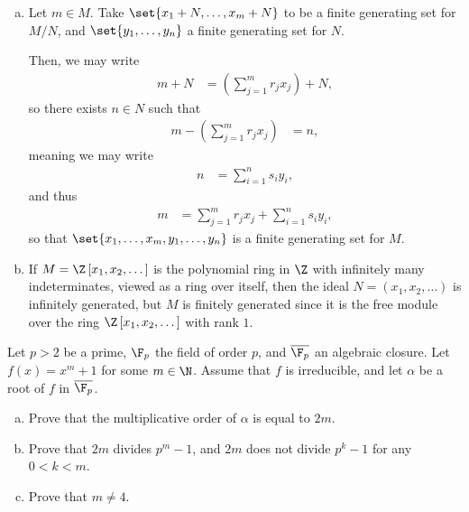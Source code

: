 \documentclass[10pt]{mypackage}
\begin{document}
\begin{solution}\hfill
  \begin{enumerate}[(a)]
    \item Let $m\in M$. Take $\set{x_1 + N,\dots,x_m + N}$ to be a finite generating set for $M/N$, and $\set{y_1,\dots,y_n}$ a finite generating set for $N$.

      Then, we may write
      \begin{align*}
        m + N &= \left( \sum_{j=1}^{m}r_jx_j \right) + N,
      \end{align*}
      so there exists $n\in N$ such that
      \begin{align*}
        m - \left( \sum_{j=1}^{m}r_jx_j \right) &= n,
      \end{align*}
      meaning we may write
      \begin{align*}
        n &= \sum_{i=1}^{n}s_iy_i,
      \end{align*}
      and thus
      \begin{align*}
        m &= \sum_{j=1}^{m}r_jx_j + \sum_{i=1}^{n}s_iy_i,
      \end{align*}
      so that $\set{x_1,\dots,x_m,y_1,\dots,y_n}$ is a finite generating set for $M$.
    \item If $M = \Z\left[ x_1,x_2,\dots \right]$ is the polynomial ring in $\Z$ with infinitely many indeterminates, viewed as a ring over itself, then the ideal $N = \left( x_1,x_2,\dots \right)$ is infinitely generated, but $M$ is finitely generated since it is the free module over the ring $\Z\left[ x_1,x_2,\dots \right]$ with rank $1$.
  \end{enumerate}
\end{solution}
\begin{problem}[Problem 8]
  Let $p > 2$ be a prime, $\F_p$ the field of order $p$, and $ \overline{\F_p} $ an algebraic closure. Let $f(x) = x^m + 1$ for some $m\in \N$. Assume that $f$ is irreducible, and let $\alpha$ be a root of $f$ in $ \overline{\F_p} $.
  \begin{enumerate}[(a)]
    \item Prove that the multiplicative order of $\alpha$ is equal to $2m$.
    \item Prove that $2m$ divides $p^m - 1$, and $2m$ does not divide $p^k - 1$ for any $0 < k < m$.
    \item Prove that $m\neq 4$.
  \end{enumerate}
\end{problem}
\end{document}
